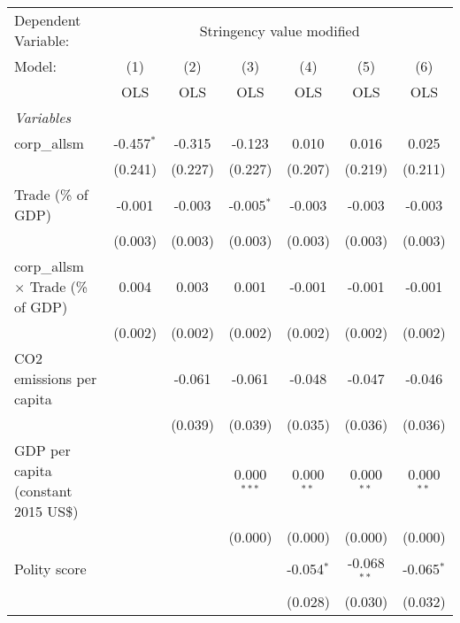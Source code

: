 
\begingroup
\centering
\begin{tabular}{lcccccc}
   \toprule
   Dependent Variable: & \multicolumn{6}{c}{Stringency value modified}\\
   Model:                                    & (1)          & (2)     & (3)           & (4)          & (5)           & (6)\\  
                                             &  OLS         & OLS     & OLS           & OLS          & OLS           & OLS\\  
   \midrule
   \emph{Variables}\\
   corp\_allsm                               & -0.457$^{*}$ & -0.315  & -0.123        & 0.010        & 0.016         & 0.025\\   
                                             & (0.241)      & (0.227) & (0.227)       & (0.207)      & (0.219)       & (0.211)\\   
   Trade (\% of GDP)                         & -0.001       & -0.003  & -0.005$^{*}$  & -0.003       & -0.003        & -0.003\\   
                                             & (0.003)      & (0.003) & (0.003)       & (0.003)      & (0.003)       & (0.003)\\   
   corp\_allsm $\times$ Trade (\% of GDP)    & 0.004        & 0.003   & 0.001         & -0.001       & -0.001        & -0.001\\   
                                             & (0.002)      & (0.002) & (0.002)       & (0.002)      & (0.002)       & (0.002)\\   
   CO2 emissions per capita                  &              & -0.061  & -0.061        & -0.048       & -0.047        & -0.046\\   
                                             &              & (0.039) & (0.039)       & (0.035)      & (0.036)       & (0.036)\\   
   GDP per capita (constant 2015 US\$)       &              &         & 0.000$^{***}$ & 0.000$^{**}$ & 0.000$^{**}$  & 0.000$^{**}$\\   
                                             &              &         & (0.000)       & (0.000)      & (0.000)       & (0.000)\\   
   Polity score                              &              &         &               & -0.054$^{*}$ & -0.068$^{**}$ & -0.065$^{*}$\\   
                                             &              &         &               & (0.028)      & (0.030)       & (0.032)\\   

\end{tabular}
